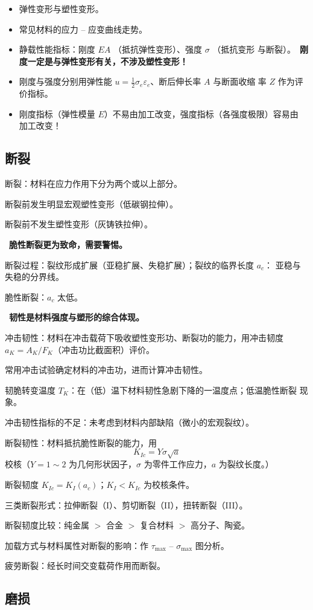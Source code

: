 \documentclass[12pt,a4paper]{article}
\newcommand{\tightlist}{\setlength{\parskip}{0pt}\setlength{\itemsep}{0pt}}
\newcommand{\hint}[1]{\textsf{（#1）}}
\newcommand{\minor}[1]{{\color{gray} #1}}
\renewcommand{\emph}[1]{\faIcon{lightbulb}\ \textbf{#1}}
\newcommand{\emphitem}[1]{\item[\faLightbulb]\ \textbf{#1}}
\newcommand{\ve}{\varepsilon}
\begin{document}
\begin{itemize}\tightlist
    \item 弹性变形与塑性变形。
    \item 常见材料的应力 -- 应变曲线走势。
    \item 静载性能指标：刚度 $EA$ \hint{抵抗弹性变形}、强度 $\sigma$ \hint{抵抗变形
    与断裂}。\emph{刚度一定是与弹性变形有关，不涉及塑性变形！}
    \item 刚度与强度分别用弹性能 $u=\frac12\sigma_e\ve_e$、断后伸长率 $A$ 与断面收缩
    率 $Z$ 作为评价指标。
    \item 刚度指标\hint{弹性模量 $E$}不易由加工改变，强度指标\hint{各强度极限}容易由
    加工改变！
\end{itemize}

\subsection{断裂}

\begin{itemize}\tightlist
    \item 断裂：材料在应力作用下分为两个或以上部分。
    \begin{description}\tightlist
        \item[韧性断裂] 断裂前发生明显宏观塑性变形\hint{低碳钢拉伸}。
        \item[脆性断裂] 断裂前不发生塑性变形\hint{灰铸铁拉伸}。
    \end{description}
    \emphitem{脆性断裂更为致命，需要警惕。}
    \item 断裂过程：裂纹形成\to 扩展\hint{亚稳扩展、失稳扩展}；裂纹的临界长度 $a_c$：
    亚稳与失稳的分界线。
    \item 脆性断裂：$a_c$ 太低。
    \emphitem{韧性是材料强度与塑形的综合体现。}
    \item 冲击韧性：材料在冲击载荷下吸收塑性变形功、断裂功的能力，用冲击韧度 $a_K=A_K/
    F_K$\hint{冲击功比截面积}评价。
    \minor{\item 常用冲击试验确定材料的冲击功，进而计算冲击韧性。}
    \item 韧脆转变温度 $T_K$：在\hint{低}温下材料韧性急剧下降的一温度点；低温脆性断裂
    现象。
    \item 冲击韧性指标的不足：未考虑到材料内部缺陷\hint{微小的宏观裂纹}。
    \item 断裂韧性：材料抵抗脆性断裂的能力，用
    \[K_{Ic}=Y\sigma\sqrt a\]
    校核\hint{$Y=1\sim2$ 为几何形状因子，$\sigma$ 为零件工作应力，$a$ 为裂纹长度。}
    \item 断裂韧度 $K_{Ic}=K_I(a_c)$；$K_I<K_{Ic}$ 为校核条件。
    \item \minor{三类断裂形式：拉伸断裂（I）、剪切断裂（II），扭转断裂（III）。}
    \item 断裂韧度比较：纯金属 $>$ 合金 $>$ 复合材料 $>$ 高分子、陶瓷。
    \item 加载方式与材料属性对断裂的影响：作 $\tau_{\max}$ -- $\sigma_{\max}$ 图分析。
    \item 疲劳断裂：经长时间交变载荷作用而断裂。
\end{itemize}

\subsection{磨损}
\end{document}
